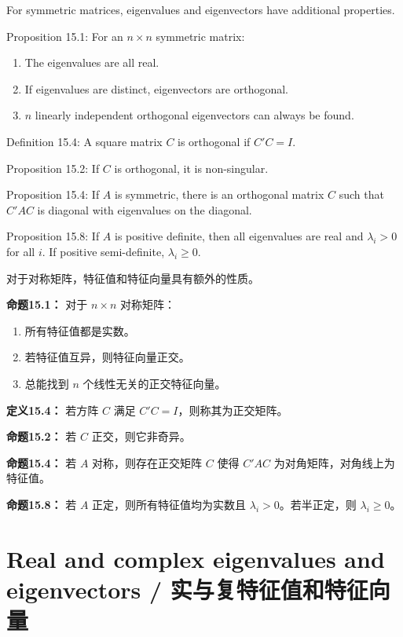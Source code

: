\begin{original}
For symmetric matrices, eigenvalues and eigenvectors have additional properties.

Proposition 15.1: For an $n \times n$ symmetric matrix:
\begin{enumerate}
\item The eigenvalues are all real.
\item If eigenvalues are distinct, eigenvectors are orthogonal.
\item $n$ linearly independent orthogonal eigenvectors can always be found.
\end{enumerate}

Definition 15.4: A square matrix $C$ is orthogonal if $C'C = I$.

Proposition 15.2: If $C$ is orthogonal, it is non-singular.

Proposition 15.4: If $A$ is symmetric, there is an orthogonal matrix $C$ such that $C'AC$ is diagonal with eigenvalues on the diagonal.

Proposition 15.8: If $A$ is positive definite, then all eigenvalues are real and $\lambda_i > 0$ for all $i$. If positive semi-definite, $\lambda_i \ge 0$.
\end{original}
\begin{translation}
对于对称矩阵，特征值和特征向量具有额外的性质。

\textbf{命题15.1：} 对于 $n \times n$ 对称矩阵：
\begin{enumerate}
\item 所有特征值都是实数。
\item 若特征值互异，则特征向量正交。
\item 总能找到 $n$ 个线性无关的正交特征向量。
\end{enumerate}

\textbf{定义15.4：} 若方阵 $C$ 满足 $C'C = I$，则称其为正交矩阵。

\textbf{命题15.2：} 若 $C$ 正交，则它非奇异。

\textbf{命题15.4：} 若 $A$ 对称，则存在正交矩阵 $C$ 使得 $C'AC$ 为对角矩阵，对角线上为特征值。

\textbf{命题15.8：} 若 $A$ 正定，则所有特征值均为实数且 $\lambda_i > 0$。若半正定，则 $\lambda_i \ge 0$。
\end{translation}

\section{Real and complex eigenvalues and eigenvectors / 实与复特征值和特征向量}

